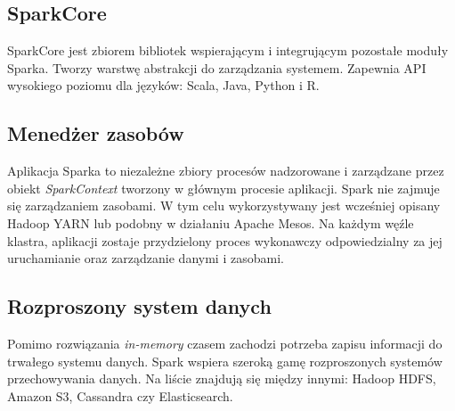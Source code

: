 \documentclass[licencjacka]{pracamgr}
\begin{document}
\subsection{SparkCore}
SparkCore jest zbiorem bibliotek wspierającym i integrującym pozostałe moduły Sparka. Tworzy warstwę abstrakcji do zarządzania systemem. Zapewnia API wysokiego poziomu dla języków: Scala, Java, Python i R.

\subsection{Menedżer zasobów}
Aplikacja Sparka to niezależne zbiory procesów nadzorowane i zarządzane przez obiekt \textit{SparkContext} tworzony w głównym procesie aplikacji. Spark nie zajmuje się zarządzaniem zasobami. W tym celu wykorzystywany jest wcześniej opisany Hadoop YARN lub podobny w działaniu Apache Mesos. Na każdym węźle klastra, aplikacji zostaje przydzielony proces wykonawczy odpowiedzialny za jej uruchamianie oraz zarządzanie danymi i zasobami.

\subsection{Rozproszony system danych}
Pomimo rozwiązania \textit{in-memory} czasem zachodzi potrzeba zapisu informacji do trwałego systemu danych. Spark wspiera szeroką gamę rozproszonych systemów przechowywania danych. Na liście znajdują się między innymi: Hadoop HDFS, Amazon S3, Cassandra czy Elasticsearch.
\end{document}
